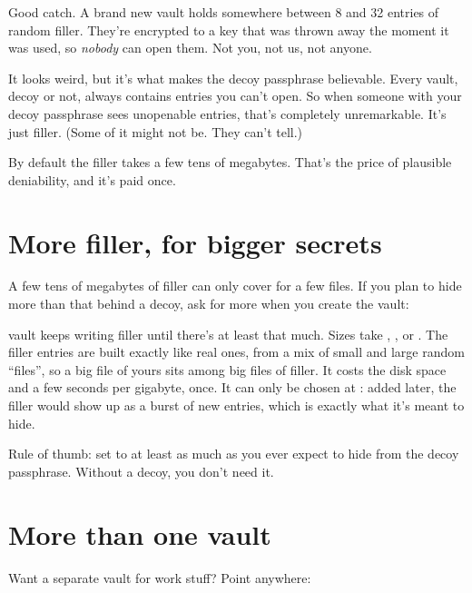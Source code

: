 \documentclass[10pt,oneside,openany]{book}
\begin{document}
Good catch. A brand new vault holds somewhere between 8 and 32 entries of
random filler. They're encrypted to a key that was thrown away the moment
it was used, so \emph{nobody} can open them. Not you, not us, not anyone.

It looks weird, but it's what makes the decoy passphrase believable. Every
vault, decoy or not, always contains entries you can't open. So when someone
with your decoy passphrase sees unopenable entries, that's completely
unremarkable. It's just filler. (Some of it might not be. They can't tell.)

\begin{headsup}
By default the filler takes a few tens of megabytes. That's the price of plausible
deniability, and it's paid once.
\end{headsup}

\section{More filler, for bigger secrets}

A few tens of megabytes of filler can only cover for a few files. If you
plan to hide more than that behind a decoy, ask for more when you create the
vault:


vault keeps writing filler until there's at least that much. Sizes take
, ,  or . The filler entries are built exactly
like real ones, from a mix of small and large random ``files'', so a big
file of yours sits among big files of filler. It costs the disk space and a
few seconds per gigabyte, once. It can only be chosen at : added
later, the filler would show up as a burst of new entries, which is exactly
what it's meant to hide.

\begin{quickwin}
Rule of thumb: set  to at least as much as you ever expect to
hide from the decoy passphrase. Without a decoy, you don't need it.
\end{quickwin}

\section{More than one vault}

Want a separate vault for work stuff? Point  anywhere:
\end{document}

